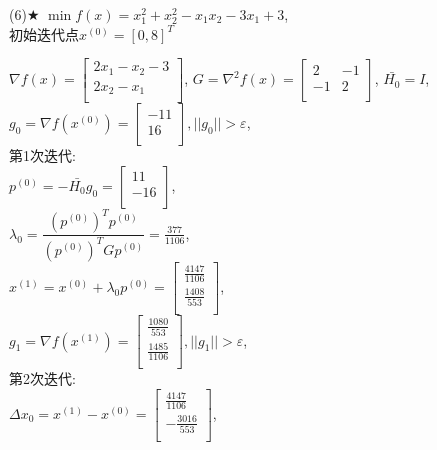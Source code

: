 \begin{problem}{(6)$\bigstar$}
    $\min f(x)=x_1^2+x_2^2-x_1x_2-3x_1+3$,\\
    初始迭代点${x^{(0)}}=[0,8]^T$
\end{problem}
\begin{solution}
    $\nabla f(x)=\begin{bmatrix}
        2x_1-x_2-3  \\
        2x_2-x_1  \\
    \end{bmatrix}$,
    $G=\nabla^2 f(x)=\begin{bmatrix}
        2 & -1  \\
        -1 & 2  \\
    \end{bmatrix}$,
    $\bar{H_0}=I$,\\
    $g_0=\nabla f(x^{(0)})=\begin{bmatrix} -11\\16\\\end{bmatrix},||g_0||>\varepsilon$,\\
    第1次迭代:\\
    $p^{(0)}=-\bar{H_0}g_0=\begin{bmatrix} 11\\-16\\\end{bmatrix}$,\\
    $\lambda_0=\dfrac{(p^{(0)})^Tp^{(0)}}{(p^{(0)})^TGp^{(0)}}=\frac{377}{1106}$,\\
    $x^{(1)}=x^{(0)}+\lambda_0p^{(0)}=\begin{bmatrix} \frac{4147}{1106}\\\frac{1408}{553}\\\end{bmatrix}$,\\
    $g_1=\nabla f(x^{(1)})=\begin{bmatrix} \frac{1080}{553}\\\frac{1485}{1106}\\\end{bmatrix},||g_1||>\varepsilon$,\\
    第2次迭代:\\
    $\Delta x_0=x^{(1)}-x^{(0)}=\begin{bmatrix} \frac{4147}{1106}\\-\frac{3016}{553}\\\end{bmatrix}$,\\

\end{solution}
